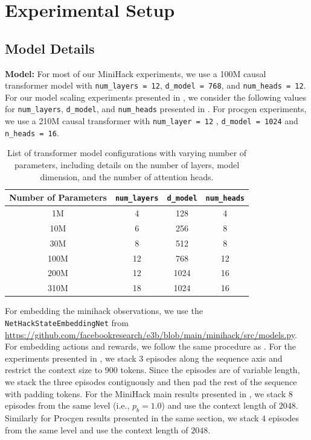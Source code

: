\appendix
\onecolumn
\section{Experimental Setup}
\subsection{Model Details}
\label{app:model_details}
\textbf{Model:}
For most of our MiniHack experiments, we use a 100M causal transformer model with \texttt{num\_layers = 12}, \texttt{d\_model = 768}, and \texttt{num\_heads = 12}. For our model scaling experiments presented in , we consider the following values for \texttt{num\_layers}, \texttt{d\_model}, and \texttt{num\_heads} presented in . For procgen experiments, we use a 210M causal transformer with \texttt{num\_layer = 12} , \texttt{d\_model = 1024} and \texttt{n\_heads = 16}. 

\begin{table}[h!]
\centering
\begin{tabular}{c c c c}
\hline
Number of Parameters & \texttt{num\_layers} & \texttt{d\_model} & \texttt{num\_heads} \\
\hline\hline
1M & 4 & 128 & 4\\
10M & 6 & 256 & 8 \\
30M & 8 & 512 & 8 \\
100M & 12 & 768 & 12 \\
200M & 12 & 1024 & 16 \\
310M & 18 & 1024 & 16 \\
\hline
\end{tabular}

\caption{List of transformer model configurations with varying number of parameters, including details on the number of layers, model dimension, and the number of attention heads.}

\label{tab:model_details}
\end{table}

For embedding the minihack observations, we use the \texttt{NetHackStateEmbeddingNet} from \href{https://github.com/facebookresearch/e3b/blob/main/minihack/src/models.py#L589}{https://github.com/facebookresearch/e3b/blob/main/minihack/src/models.py}. For embedding actions and rewards, we follow the same procedure as \cite{decision_transformer}. For the experiments presented in , we stack $3$ episodes along the sequence axis and restrict the context size to $900$ tokens. Since the episodes are of variable length, we stack the three episodes contiguously and then pad the rest of the sequence with padding tokens. For the MiniHack main results presented in , we stack $8$ episodes from the same level (i.e., $p_b = 1.0$) and use the context length of $2048$. Similarly for Procgen results presented in the same section, we stack $4$ episodes from the same level and use the context length of $2048$.

